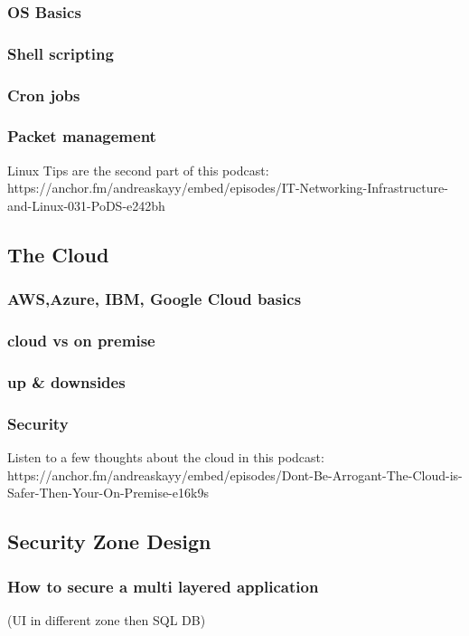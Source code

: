 \documentclass[12pt]{scrartcl} %
\begin{document}
\subsubsection{OS Basics}

\subsubsection{Shell scripting}

\subsubsection{Cron jobs}

\subsubsection{Packet management}
Linux Tips are the second part of this podcast: https://anchor.fm/andreaskayy/embed/episodes/IT-Networking-Infrastructure-and-Linux-031-PoDS-e242bh

\subsection{The Cloud}

\subsubsection{AWS,Azure, IBM, Google Cloud basics}
\subsubsection{cloud vs on premise}
\subsubsection{up \& downsides}
\subsubsection{Security}

Listen to a few thoughts about the cloud in this podcast: https://anchor.fm/andreaskayy/embed/episodes/Dont-Be-Arrogant-The-Cloud-is-Safer-Then-Your-On-Premise-e16k9s
 

\subsection{Security Zone Design} 
\subsubsection{How to secure a multi layered application} 
(UI in different zone then SQL DB)
\end{document}
